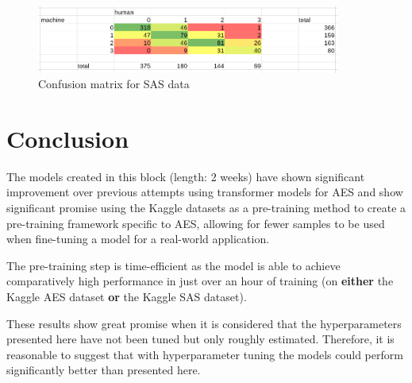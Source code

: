 \documentclass[11pt]{article}
\begin{document}
\begin{figure}[htbp]
\centering
\includegraphics[width=10cm]{./exp5_sas_confusion.png}
\caption{Confusion matrix for SAS data}
\end{figure}

\newpage

\section{Conclusion}
\label{sec:org8914baf}
The models created in this block (length: 2 weeks) have shown significant improvement over previous attempts using transformer models for AES and show significant promise using the Kaggle datasets as a pre-training method to create a pre-training framework specific to AES, allowing for fewer samples to be used when fine-tuning a model for a real-world application.

The pre-training step is time-efficient as the model is able to achieve comparatively high performance in just over an hour of training (on \textbf{\textbf{either}} the Kaggle AES dataset \textbf{\textbf{or}} the Kaggle SAS dataset).

These results show great promise when it is considered that the hyperparameters presented here have not been tuned but only roughly estimated. Therefore, it is reasonable to suggest that with hyperparameter tuning the models could perform significantly better than presented here.



\end{document}
